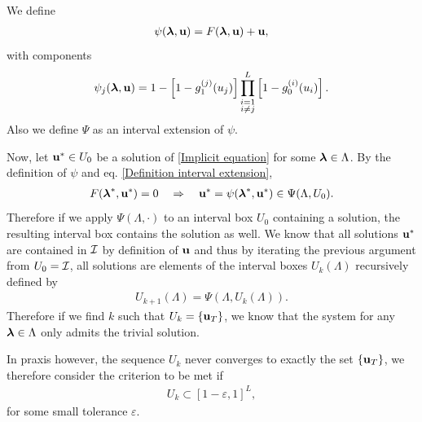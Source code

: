 \documentclass[
11pt, %
english, %
singlespacing, %
nolistspacing, %
liststotoc, %
headsepline, %
]{MastersDoctoralThesis} %
\begin{document}
We define
\begin{align}
	\psi(\boldsymbol{\mathrm{\lambda}}, \boldsymbol{\mathrm{u}}) = F(\boldsymbol{\mathrm{\lambda}}, \boldsymbol{\mathrm{u}}) + \boldsymbol{\mathrm{u}},
\end{align}
with components
\begin{align}
	\psi_j(\boldsymbol{\mathrm{\lambda}}, \boldsymbol{\mathrm{u}}) = 1 - \left[1 - g_1^{(j)}(u_j) \right] \prod_{\substack{i = 1 \\ i \neq j}}^{L}  \left[1 - g_0^{(i)}(u_i) \right].
\end{align}
Also we define $\Psi$ as an interval extension of $\psi$.

Now, let $\boldsymbol{\mathrm{u}}^* \in U_0$ be a solution of \eqref{Implicit equation} for some $\boldsymbol{\mathrm{\lambda}} \in \Lambda$. By the definition of $\psi$ and eq. \eqref{Definition interval extension},
\begin{align}
	F(\boldsymbol{\mathrm{\lambda}}^*, \boldsymbol{\mathrm{u}}^*) = 0 \quad \Rightarrow \quad \boldsymbol{\mathrm{u}}^* = \psi(\boldsymbol{\mathrm{\lambda}}^*, \boldsymbol{\mathrm{u}}^*) \in \Psi(\Lambda, U_0).
\end{align}
Therefore if we apply $\Psi(\Lambda, \cdot)$ to an interval box $U_0$ containing a solution, the resulting interval box contains the solution as well. We know that all solutions $\boldsymbol{\mathrm{u}}^*$ are contained in $\mathcal{I}$ by definition of $\boldsymbol{\mathrm{u}}$ and thus by iterating the previous argument from $U_0 = \mathcal{I}$, all solutions are elements of the interval boxes $U_k(\Lambda)$ recursively defined by
\begin{align}
	U_{k+1}(\Lambda) = \Psi(\Lambda, U_k(\Lambda)). \label{Recursion relation for Uk}
\end{align}
Therefore if we find $k$ such that $U_k = \{\boldsymbol{\mathrm{u}}_T\}$, we know that the system for any $\boldsymbol{\mathrm{\lambda}} \in \Lambda$ only admits the trivial solution.

In praxis however, the sequence $U_k$ never converges to exactly the set $\{\boldsymbol{\mathrm{u}}_T\}$, we therefore consider the criterion to be met if
\begin{align}
	U_k \subset [1 - \varepsilon, 1]^L, \label{Criterion for trivial region}
\end{align}
for some small tolerance $\varepsilon$.
\end{document}
